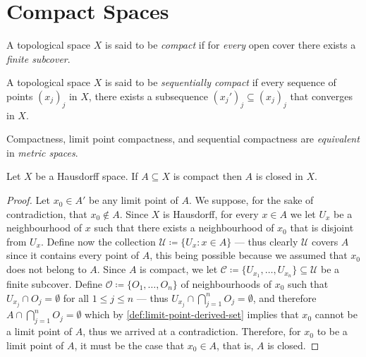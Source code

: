 \section{Compact Spaces}

\begin{definition}
\label{def:compact-space}
A topological space \(X\) is said to be \emph{compact} if for \emph{every} open
cover there exists a \emph{finite subcover}.
\end{definition}

\begin{definition}
\label{def:sequentially-compact}
A topological space \(X\) is said to be \emph{sequentially compact} if every
sequence of points \((x_j)_j\) in \(X\), there exists a subsequence \((x_j')_j
\subseteq (x_j)_j\) that converges in \(X\).
\end{definition}

\begin{proposition}
\label{prop:metric-space-compactness-equivalences}
Compactness, limit point compactness, and sequential compactness are
\emph{equivalent} in \emph{metric spaces}.
\end{proposition}


\begin{proposition}
\label{prop:hausdorff-compact-implies-closed}
Let \(X\) be a Hausdorff space. If \(A \subseteq X\) is compact then \(A\) is
closed in \(X\).
\end{proposition}

\begin{proof}
Let \(x_0 \in A'\) be any limit point of \(A\). We suppose, for the sake of
contradiction, that \(x_0 \notin A\). Since \(X\) is Hausdorff, for every \(x
\in A\) we let \(U_x\) be a neighbourhood of \(x\) such that there exists a
neighbourhood of \(x_0\) that is disjoint from \(U_x\). Define now the
collection \(\mathcal{U} \coloneq \{U_x : x \in A\}\) --- thus clearly
\(\mathcal{U}\) covers \(A\) since it contains every point of \(A\), this being
possible because we assumed that \(x_0\) does not belong to \(A\). Since \(A\)
is compact, we let \(\mathcal{C} \coloneq \{U_{x_1}, \dots, U_{x_n}\} \subseteq
\mathcal{U}\) be a finite subcover. Define \(\mathcal{O} \coloneq \{O_1, \dots,
O_n\}\) of neighbourhoods of \(x_0\) such that \(U_{x_j} \cap O_j = \emptyset\)
for all \(1 \leq j \leq n\) --- thus \(U_{x_j} \cap \bigcap_{j=1}^n O_j =
\emptyset\), and therefore \(A \cap \bigcap_{j=1}^n O_j = \emptyset\) which by
\cref{def:limit-point-derived-set} implies that \(x_0\) cannot be a limit point
of \(A\), thus we arrived at a contradiction. Therefore, for \(x_0\) to be a
limit point of \(A\), it must be the case that \(x_0 \in A\), that is, \(A\) is
closed.
\end{proof}

